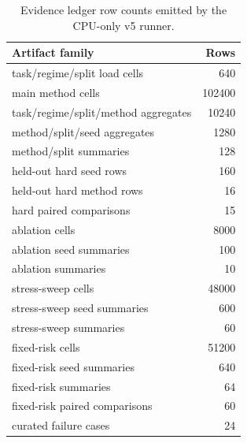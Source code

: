 \begin{table}[t]
\centering
\caption{Evidence ledger row counts emitted by the CPU-only v5 runner.}
\small
\begin{tabular}{lr}
\toprule
Artifact family & Rows \\
\midrule
task/regime/split load cells & 640 \\
main method cells & 102400 \\
task/regime/split/method aggregates & 10240 \\
method/split/seed aggregates & 1280 \\
method/split summaries & 128 \\
held-out hard seed rows & 160 \\
held-out hard method rows & 16 \\
hard paired comparisons & 15 \\
ablation cells & 8000 \\
ablation seed summaries & 100 \\
ablation summaries & 10 \\
stress-sweep cells & 48000 \\
stress-sweep seed summaries & 600 \\
stress-sweep summaries & 60 \\
fixed-risk cells & 51200 \\
fixed-risk seed summaries & 640 \\
fixed-risk summaries & 64 \\
fixed-risk paired comparisons & 60 \\
curated failure cases & 24 \\
\bottomrule
\end{tabular}
\end{table}
